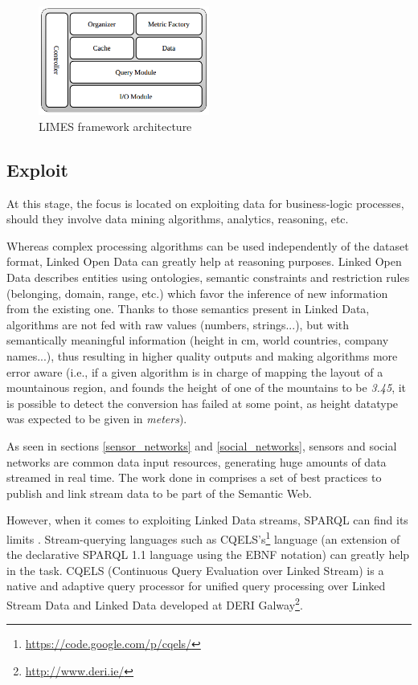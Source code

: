 \begin{figure}
    \center
    \includegraphics[width=0.5\textwidth]{img/ld_approach/limes.png}
    \caption{LIMES framework architecture}
    \label{fig:limes}
\end{figure}

\subsection{Exploit}
\label{subsec:exploit}

At this stage, the focus is located on exploiting data for business-logic processes, should they involve data mining algorithms, analytics, reasoning, etc.

Whereas complex processing algorithms can be used independently of the dataset format, Linked Open Data can greatly help at reasoning purposes. Linked Open Data describes entities using ontologies, semantic constraints and restriction rules (belonging, domain, range, etc.) which favor the inference of new information from the existing one. Thanks to those semantics present in Linked Data, algorithms are not fed with raw values (numbers, strings...), but with semantically meaningful information (height in cm, world countries, company names...), thus resulting in higher quality outputs and making algorithms more error aware (i.e., if a given algorithm is in charge of mapping the layout of a mountainous region, and founds the height of one of the mountains to be \textit{3.45}, it is possible to detect the conversion has failed at some point, as height datatype was expected to be given in \textit{meters}).

As seen in sections \ref{sensor_networks} and \ref{social_networks}, sensors and social networks are common data input resources, generating huge amounts of data streamed in real time. The work done in \cite{sequeda2009linked} comprises a set of best practices to publish and link stream data to be part of the Semantic Web.

However, when it comes to exploiting Linked Data streams, SPARQL can find its limits \cite{della2009s}. Stream-querying languages such as CQELS's\footnote{\url{https://code.google.com/p/cqels/}} language (an extension of the declarative SPARQL 1.1 language using the EBNF notation) can greatly help in the task. CQELS\cite{le2011native} (Continuous Query Evaluation over Linked Stream) is a native and adaptive query processor for unified query processing over Linked Stream Data and Linked Data developed at DERI Galway\footnote{\url{http://www.deri.ie/}}.

